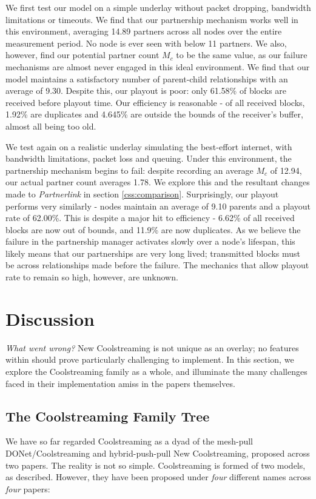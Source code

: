 \documentclass[12pt,a4paper]{article}
\begin{document}
We first test our model on a simple underlay without packet dropping, bandwidth limitations or timeouts. We find that our partnership mechanism works well in this environment, averaging 14.89 partners across all nodes over the entire measurement period. No node is ever seen with below 11 partners. We also, however, find our potential partner count \(M_c\) to be the same value, as our failure mechanisms are almost never engaged in this ideal environment. We find that our model maintains a satisfactory number of parent-child relationships with an average of 9.30. Despite this, our playout is poor:  only 61.58\% of blocks are received before playout time. Our efficiency is reasonable - of all received blocks, 1.92\% are duplicates and 4.645\% are outside the bounds of the receiver's buffer, almost all being too old.

We test again on a realistic underlay simulating the best-effort internet, with bandwidth limitations, packet loss and queuing. Under this environment, the partnership mechanism begins to fail: despite recording an average \(M_c\) of 12.94, our actual partner count averages 1.78. We explore this and the resultant changes made to \textit{Partnerlink} in section \ref{css:comparison}. Surprisingly, our playout performs very similarly - nodes maintain an average of 9.10 parents and a playout rate of 62.00\%. This is despite a major hit to efficiency - 6.62\% of all received blocks are now out of  bounds, and 11.9\% are now duplicates. As we believe the failure in the partnership manager activates slowly over a node's lifespan, this likely means that our partnerships are very long lived; transmitted blocks must be across relationships made before the failure. The mechanics that allow playout rate to remain so high, however, are unknown.

\section{Discussion} \label{problems}
\textit{What went wrong?} New Coolstreaming is not unique as an overlay; no features within should prove particularly challenging to implement. In this section, we explore the Coolstreaming family as a whole, and illuminate the many challenges faced in their implementation amiss in the papers themselves.

\subsection{The Coolstreaming Family Tree} \label{problems:familytree}
We have so far regarded Coolstreaming as a dyad of the mesh-pull DONet/Coolstreaming and hybrid-push-pull New Coolstreaming, proposed across two papers. The reality is not so simple. Coolstreaming is formed of two models, as described. However, they have been proposed under \textit{four} different names across \textit{four} papers:
\end{document}
